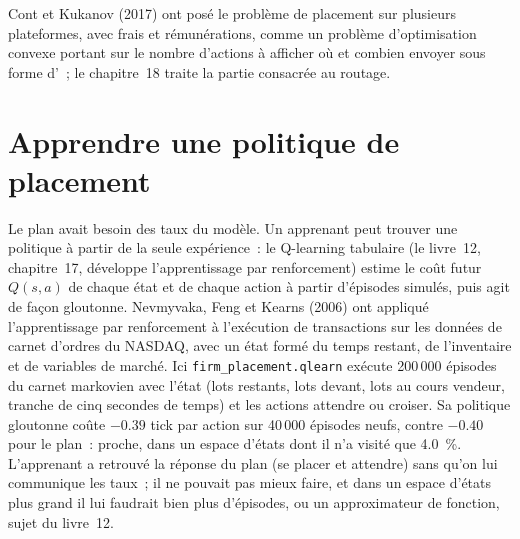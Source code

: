 \begin{omfigure}

\label{fig:mx:child-order-placement:urgent}
\end{omfigure}

Cont et Kukanov (2017) ont posé le problème de placement sur plusieurs plateformes, avec frais et rémunérations, comme un problème d'optimisation convexe portant sur le nombre d'actions à afficher
où et combien envoyer sous forme d'~; le chapitre~18 traite la partie consacrée au routage.

\section{Apprendre une politique de placement}

Le plan avait besoin des taux du modèle. Un apprenant peut trouver une politique à partir de la seule expérience~: le Q-learning tabulaire (le livre~12, chapitre~17, développe
l'apprentissage par renforcement) estime le coût futur $Q(s,a)$ de chaque état et de chaque action à partir d'épisodes simulés, puis agit de façon gloutonne. Nevmyvaka, Feng et
Kearns (2006) ont appliqué l'apprentissage par renforcement à l'exécution de transactions sur les données de carnet d'ordres du NASDAQ, avec un état formé du temps restant, de l'inventaire et de variables de marché.
Ici \texttt{firm\_placement.qlearn} exécute 200\,000 épisodes du carnet markovien avec l'état (lots restants, lots devant, lots au cours vendeur, tranche de cinq secondes
de temps) et les actions attendre ou croiser. Sa politique gloutonne coûte $-0.39$ tick par action sur 40\,000 épisodes neufs, contre $-0.40$ pour le plan~:
proche, dans un espace d'états dont il n'a visité que 4.0~\%. L'apprenant a retrouvé la réponse du plan (se placer et attendre) sans qu'on lui communique les taux~; il ne pouvait
pas mieux faire, et dans un espace d'états plus grand il lui faudrait bien plus d'épisodes, ou un approximateur de fonction, sujet du livre~12.


